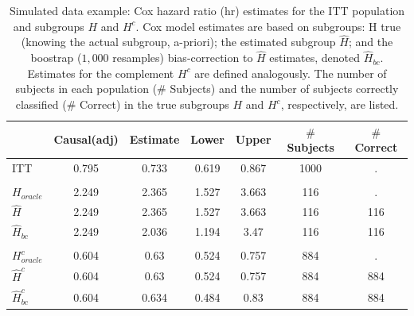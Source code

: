 \documentclass[12pt]{article}
\begin{document}
\begin{table}
\centering
\caption{\label{tab:simex_tab}\label{tab:simex} Simulated data example: Cox hazard ratio (hr) estimates for the ITT population and subgroups $H$ and $H^{c}$.
Cox model estimates are based on subgroups: H true (knowing the actual subgroup, a-priori); the estimated subgroup $\hat{H}$; and 
the boostrap ($1,000$ resamples) bias-correction to $\hat{H}$ estimates, denoted $\hat{H}_{bc}$.  Estimates for the complement $H^{c}$ are defined analogously.
The number of subjects in each population ($\#$ Subjects) and the number of subjects correctly classified ($\#$ Correct) in the true subgroups $H$ and $H^{c}$, respectively, are listed.}
\centering
\fontsize{9}{11}\selectfont
\begin{tabular}[t]{lcccccc}
\toprule
  & Causal(adj) & Estimate & Lower & Upper & $\#$ Subjects & $\#$ Correct\\
\midrule
ITT & 0.795 & 0.733 & 0.619 & 0.867 & 1000 & .\\
\addlinespace[0.3em]
\multicolumn{7}{l}{\textbf{H subgroup estimates}}\\
\hspace{1em}$H_{oracle}$ & 2.249 & 2.365 & 1.527 & 3.663 & 116 & .\\
\hspace{1em}$\hat{H}$ & 2.249 & 2.365 & 1.527 & 3.663 & 116 & 116\\
\hspace{1em}$\hat{H}_{bc}$ & 2.249 & 2.036 & 1.194 & 3.47 & 116 & 116\\
\addlinespace[0.3em]
\multicolumn{7}{l}{\textbf{H-complement subgroup estimates}}\\
\hspace{1em}$H^{c}_{oracle}$ & 0.604 & 0.63 & 0.524 & 0.757 & 884 & .\\
\hspace{1em}$\hat{H}^{c}$ & 0.604 & 0.63 & 0.524 & 0.757 & 884 & 884\\
\hspace{1em}$\hat{H}^{c}_{bc}$ & 0.604 & 0.634 & 0.484 & 0.83 & 884 & 884\\
\bottomrule
\end{tabular}
\end{table}




 

\end{document}

